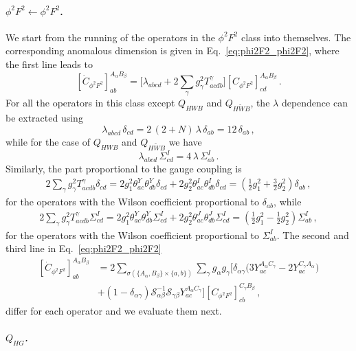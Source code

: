 \paragraph{\texorpdfstring{$\phi^2 F^2 \leftarrow \phi^2 F^2$}{phi2F2fromphi2F2}.}

We start from the running of the operators in the $\phi^2 F^2$ class into themselves. The corresponding anomalous dimension is given in Eq.~\eqref{eq:phi2F2_phi2F2}, where the first line leads to
\begin{equation}
    \left[\dot{C}_{\phi^2 F^2}\right]_{ab}^{A_\alpha B_\beta} = \bigg[\lambda_{abcd}+2\sum_\gamma g_\gamma^2T^\gamma_{a c d b}\bigg]\left[C_{\phi^2 F^2}\right]_{c d}^{A_\alpha B_\beta}\,.
\end{equation}
For all the operators in this class except $Q_{HWB}$ and $Q_{H\widetilde{W}B}$, the $\lambda$ dependence can be extracted using
\begin{equation}
    \lambda_{abcd}\,\delta_{cd} = 2\,(2+N)\, \lambda\, \delta_{ab} = 12\, \delta_{ab}\,,
    \label{eq:phi2F2_lambda_delta}
\end{equation}
while for the case of $Q_{HWB}$ and $Q_{H\widetilde{W}B}$ we have
\begin{equation}
    \lambda_{abcd}\,\Sigma^I_{cd} = 4\, \lambda\, \Sigma^I_{ab}\,.
    \label{eq:phi2F2_lambda_sigma}
\end{equation}
Similarly, the part proportional to the gauge coupling is 
\begin{align}
    2\sum_\gamma g_\gamma^2 T^\gamma_{a c d b}\delta_{cd} = 2 g_1^2 \theta^Y_{ac}\theta^Y_{db}\delta_{cd} +  2g_2^2 \theta^I_{ac}\theta^I_{db} \delta_{cd}= \left(\frac{1}{2}g_1^2 + \frac{3}{2} g_2^2\right) \delta_{ab}\,,
    \label{eq:phi2F2_g_delta}
\end{align}
for the operators with the Wilson coefficient proportional to $\delta_{ab}$, while 
\begin{align}
    2\sum_\gamma g_\gamma^2 T^\gamma_{a c d b}\Sigma_{cd}^I = 2g_1^2 \theta^Y_{ac}\theta^Y_{db} \Sigma_{cd}^I +  2g_2^2 \theta^J_{ac}\theta^J_{db} \Sigma_{cd}^I= \left(\frac{1}{2}g_1^2 - \frac{1}{2} g_2^2\right) \Sigma_{ab}^I\,,
    \label{eq:phi2F2_g_sigma}
\end{align}
for the operators with the Wilson coefficient proportional to $\Sigma^I_{ab}$. The second and third line in Eq.~\eqref{eq:phi2F2_phi2F2} 
\begin{align}
     \left[\dot{C}_{\phi^2 F^2}\right]_{ab}^{A_\alpha B_\beta} &= 2\sum_{\sigma(\{A_\alpha ,B_\beta\}\times \{a , b\})}\sum_{\gamma}g_\alpha g_\gamma\Big[ \delta_{\alpha\gamma}\Big(3Y_{ac}^{A_\alpha C_\gamma}-2Y_{ac}^{C_\gamma A_\alpha}\Big) \nonumber\\
    & +(1-\delta_{\alpha\gamma}) \mathcal S_{\alpha\beta}^{-1} \mathcal{S}_{\gamma\beta}  Y_{ac }^{A_\alpha C_\gamma}   \Big]\left[C_{\phi^2 F^2}\right]_{cb}^{C_\gamma B_\beta}\,,
    \label{eq:phi2F2_phi2F2_23lines}
\end{align}
differ for each operator and we evaluate them next.
\subparagraph{\texorpdfstring{$Q_{HG}$}{Q_HG}.}

